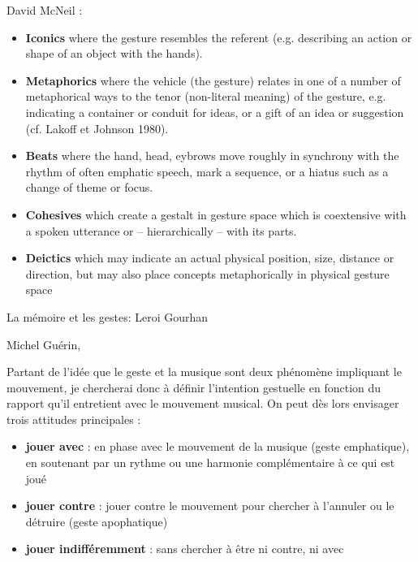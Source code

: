 \noindent David McNeil : 
\vspace{-1em}
\begin{itemize}[noitemsep]
\item \textbf{Iconics} where the gesture resembles the referent (e.g. describing an action or shape of an object with the hands).
\item \textbf{Metaphorics} where the vehicle (the gesture) relates in one of a number of metaphorical ways to the tenor (non-literal meaning) of the gesture, e.g. indicating a container or conduit for ideas, or a gift of an idea or suggestion (cf. Lakoff et Johnson 1980).
\item \textbf{Beats} where the hand, head, eybrows move roughly in synchrony with the rhythm of often emphatic speech, mark a sequence, or a hiatus such as a change of theme or focus.
\item \textbf{Cohesives} which create a gestalt in gesture space which is coextensive with a spoken utterance or – hierarchically – with its parts.
\item \textbf{Deictics} which may indicate an actual physical position, size, distance or direction, but may also place concepts metaphorically in physical gesture space
\end{itemize}


La mémoire et les gestes:
Leroi Gourhan

 Michel Guérin, \cite{guerin_philosophie_2018}




Partant de l'idée que le geste et la musique sont deux phénomène impliquant le mouvement, je chercherai donc à définir l'intention gestuelle en fonction du rapport qu'il entretient avec le mouvement musical.
On peut dès lors envisager trois attitudes principales :
\vspace{-1em}
\begin{itemize}[noitemsep]
\item \textbf{jouer avec} : en phase avec le mouvement de la musique (geste emphatique), en soutenant par un rythme ou une harmonie complémentaire à ce qui est joué
\item \textbf{jouer contre} : jouer contre le mouvement pour chercher à l'annuler ou le détruire (geste apophatique)
\item \textbf{jouer indifféremment} : sans chercher à être ni contre, ni avec
\end{itemize}

